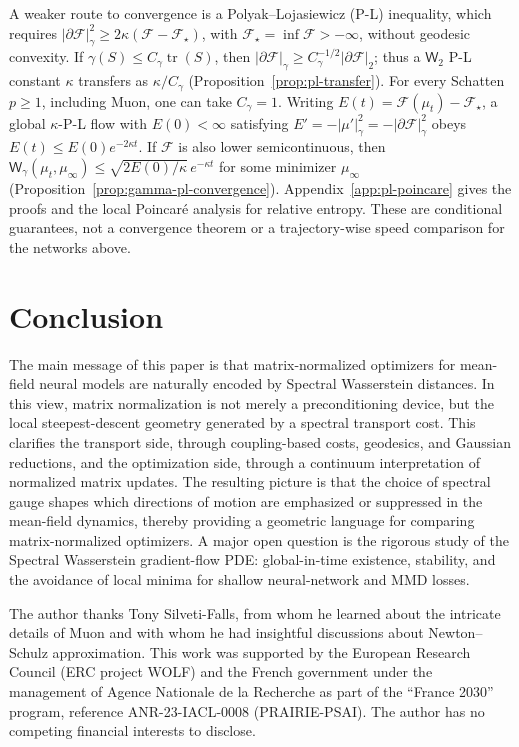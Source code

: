 \documentclass{article}
\newcommand{\MF}{\mathcal{F}}
\newcommand{\Wtwo}{\mathsf{W}_2}
\newcommand{\Wg}{\mathsf{W}_{\gamma}}
\newcommand{\tr}{\operatorname{tr}}
\begin{document}
A weaker route to convergence is a Polyak--Lojasiewicz (P-L) inequality,
which requires $|\partial\MF|_\gamma^2\ge2\kappa(\MF-\MF_\star)$, with
$\MF_\star=\inf\MF> -\infty$, without geodesic convexity. If
$\gamma(S)\le C_\gamma\tr(S)$, then
$|\partial\MF|_\gamma\ge C_\gamma^{-1/2}|\partial\MF|_2$;
thus a $\Wtwo$ P-L constant $\kappa$ transfers as $\kappa/C_\gamma$
(Proposition~\ref{prop:pl-transfer}). For every Schatten $p\ge1$, including
Muon, one can take $C_\gamma=1$. Writing $E(t)=\MF(\mu_t)-\MF_\star$,
a global $\kappa$-P-L flow with $E(0)<\infty$ satisfying
$E'=-|\mu'|_\gamma^2=-|\partial\MF|_\gamma^2$ obeys
$E(t)\le E(0)e^{-2\kappa t}$. If $\MF$ is also lower semicontinuous, then
$\Wg(\mu_t,\mu_\infty)\le\sqrt{2E(0)/\kappa}\,e^{-\kappa t}$ for some
minimizer $\mu_\infty$ (Proposition~\ref{prop:gamma-pl-convergence}).
Appendix~\ref{app:pl-poincare} gives the proofs and the local Poincar\'e
analysis for relative entropy. These are conditional guarantees, not a
convergence theorem or a trajectory-wise speed comparison for the networks above.

\section{Conclusion}
\label{sec:conclusion} 

The main message of this paper is that matrix-normalized optimizers for
mean-field neural models are naturally encoded by Spectral Wasserstein
distances. In this view, matrix normalization is not merely a preconditioning
device, but the local steepest-descent geometry generated by a spectral transport
cost. This clarifies the transport side, through coupling-based costs, geodesics,
and Gaussian reductions, and the optimization side, through a continuum
interpretation of normalized matrix updates.
%
The resulting picture is that the choice of spectral gauge shapes which
directions of motion are emphasized or suppressed in the mean-field dynamics,
thereby providing a geometric language for comparing matrix-normalized
optimizers. A major open question is the rigorous study of the Spectral
Wasserstein gradient-flow PDE: global-in-time existence, stability, and the
avoidance of local minima for shallow neural-network and MMD losses.



\clearpage
\begin{ack}
The author thanks Tony Silveti-Falls, from whom he learned about the intricate
details of Muon and with whom he had insightful discussions about
Newton--Schulz approximation. This work was supported by the European Research
Council (ERC project WOLF) and the French government under the management of
Agence Nationale de la Recherche as part of the ``France 2030'' program,
reference ANR-23-IACL-0008 (PRAIRIE-PSAI).
The author has no competing financial interests to disclose.
\end{ack}
\end{document}
